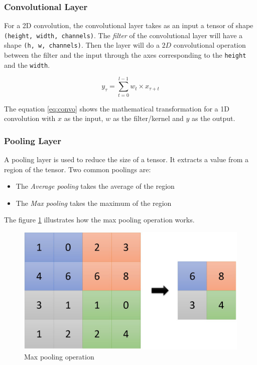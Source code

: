 \documentclass[12pt]{report}
\begin{document}
\subsubsection{Convolutional Layer}

For a 2D convolution, the convolutional layer takes as an input a tensor of shape \texttt{(height, width, channels)}.
The \textit{filter} of the convolutional layer will have a shape \texttt{(h, w, channels)}.
Then the layer will do a $2D$ convolutional operation between the filter and the input through the axes corresponding to the \texttt{height} and the \texttt{width}.

\begin{equation}
    y_{\tau} = \sum_{t=0}^{l-1} w_{t} \times x_{\tau + t}
    \label{eq:convo}
\end{equation}

The equation \ref{eq:convo} shows the mathematical transformation for a 1D convolution with $x$ as the input, $w$ as the filter/kernel and $y$ as the output.

\subsubsection{Pooling Layer}

A pooling layer is used to reduce the size of a tensor. It extracts a value from a region of the tensor. Two common poolings are:
\begin{itemize}
    \item The \textit{Average pooling} takes the average of the region
    \item The \textit{Max pooling} takes the maximum of the region
\end{itemize}
The figure \ref{fig:max_pooling} illustrates how the max pooling operation works.

\begin{figure}[H]
    \centering
    \includegraphics[width=0.75 \textwidth]{images/nn/layers/max_pooling.jpg}
    \caption{Max pooling operation}
    \label{fig:max_pooling}
\end{figure}
\end{document}
